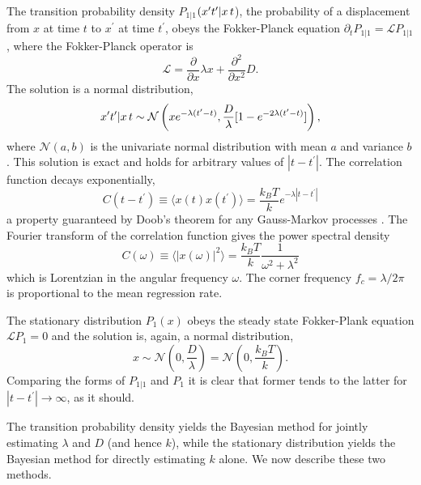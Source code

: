 \documentclass[fleqn,10pt]{wlscirep}
\begin{document}
The transition probability density $P_{1|1}$$(x^{\prime}t^{\prime}|x\thinspace t$),
the probability of a displacement from $x$ at time $t$ to $x^{\prime}$
at time $t^{\prime}$, obeys the Fokker-Planck equation $\partial_{t}P_{1|1}=\mathcal{L}P_{1|1}$,
where the Fokker-Planck operator is
\begin{equation}
\mathcal{L}=\frac{\partial}{\partial x}\lambda x+\frac{\partial^{2}}{\partial x^{2}}D.
\end{equation}
The solution is a normal distribution,
\begin{equation}
x^{\prime}t^{\prime}|x\thinspace t\sim\mathcal{N}\left(xe^{-\lambda(t^{\prime}-t)},\frac{D}{\lambda}[1-e^{-2\lambda(t^{\prime}-t)}]\right),
\end{equation}
where $\mathcal{N}(a,b)$ is the univariate normal distribution with
mean $a$ and variance $b$. This solution is exact and holds for
arbitrary values of $|t-t^{\prime}|$. The correlation function decays
exponentially, 
\begin{equation}
C(t-t^{\prime})\equiv\langle x(t)x(t^{\prime})\rangle=\frac{k_{B}T}{k}e^{-\lambda|t-t^{\prime}|}\label{eq:autocorr}
\end{equation}
a property guaranteed by Doob's theorem for any Gauss-Markov processes
\cite{van1992stochastic}. The Fourier transform of the correlation
function gives the power spectral density
\begin{equation}
C(\omega)\equiv\langle|x(\omega)|^{2}\rangle=\frac{k_{B}T}{k}\frac{1}{\omega^{2}+\lambda^{2}}\label{eq:spectral-density}
\end{equation}
which is Lorentzian in the angular frequency $\omega$. The corner
frequency $f_{c}=\lambda/2\pi$ is proportional to the mean regression
rate. 

The stationary distribution $P_{1}(x)$ obeys the steady state Fokker-Plank
equation $\mathcal{L}P_{1}=0$ and the solution is, again, a normal
distribution,
\begin{equation}
x\sim\mathcal{N}\left(0,\frac{D}{\lambda}\right)=\mathcal{N}\left(0,\frac{k_{B}T}{k}\right).
\end{equation}
Comparing the forms of $P_{1|1}$ and $P_{1}$ it is clear that former
tends to the latter for $|t-t^{\prime}|\rightarrow\infty$, as it
should. 

The transition probability density yields the Bayesian method for
jointly estimating $\lambda$ and $D$ (and hence $k$), while the
stationary distribution yields the Bayesian method for directly estimating
$k$ alone. We now describe these two methods.
\end{document}
